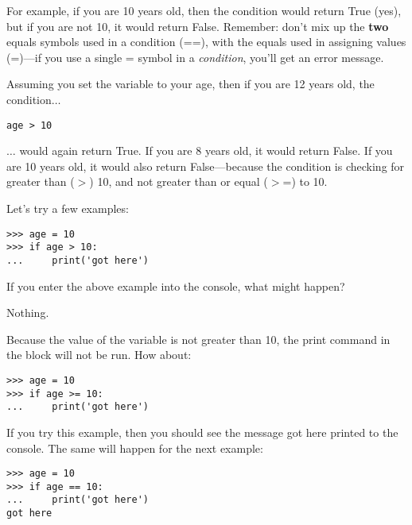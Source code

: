 For example, if you are 10 years old, then the condition  would return True (yes), but if you are not 10, it would return False.  Remember: don't mix up the \textbf{two} equals symbols used in a condition (==), with the equals used in assigning values (=)---if you use a single = symbol in a \emph{condition}, you'll get an error message.
\par
Assuming you set the variable  to your age, then if you are 12 years old, the condition$\ldots$

\begin{listing}
\begin{verbatim}
age > 10
\end{verbatim}
\end{listing}

$\ldots$ would again return True.  If you are 8 years old, it would return False.  If you are 10 years old, it would also return False---because the condition is checking for greater than ($>$) 10, and not greater than or equal ($>$=) to 10.

Let's try a few examples:

\begin{listing}
\begin{verbatim}
>>> age = 10
>>> if age > 10:
...     print('got here')
\end{verbatim}
\end{listing}

\noindent
If you enter the above example into the console, what might happen?
\par
\noindent
Nothing.
\par
\noindent
Because the value of the variable  is not greater than 10, the print command in the block will not be run. How about:

\begin{listingignore}
\begin{verbatim}
>>> age = 10
>>> if age >= 10:
...     print('got here')
\end{verbatim}
\end{listingignore}

If you try this example, then you should see the message got here printed to the console.  The same will happen for the next example:

\begin{listing}
\begin{verbatim}
>>> age = 10
>>> if age == 10:
...     print('got here')
got here
\end{verbatim}
\end{listing}

